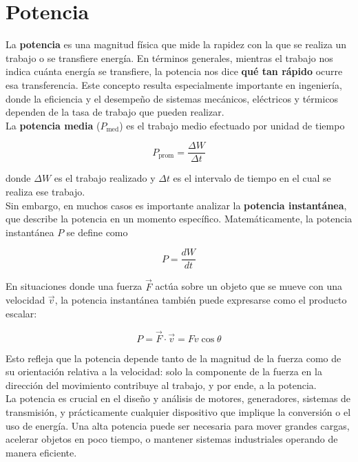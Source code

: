 \section{Potencia}
La \textbf{potencia} es una magnitud física que mide la rapidez con la que se realiza un trabajo o se transfiere energía. En términos generales, mientras el trabajo nos indica cuánta energía se transfiere, la potencia nos dice \textbf{qué tan rápido} ocurre esa transferencia. Este concepto resulta especialmente importante en ingeniería, donde la eficiencia y el desempeño de sistemas mecánicos, eléctricos y térmicos dependen de la tasa de trabajo que pueden realizar. \\[.35cm]

La \textbf{potencia media} (\( P_{\text{med}} \)) es  el trabajo medio efectuado por unidad de tiempo

\begin{equation}
P_{\text{prom}} = \frac{\Delta W}{\Delta t}
\end{equation}

donde \( \Delta W \) es el trabajo realizado y \( \Delta t \) es el intervalo de tiempo en el cual se realiza ese trabajo. \\[.35cm]

Sin embargo, en muchos casos es importante analizar la \textbf{potencia instantánea}, que describe la potencia en un momento específico. Matemáticamente, la potencia instantánea \( P \) se define como

\begin{equation}
P = \frac{dW}{dt}
\end{equation}

En situaciones donde una fuerza \( \vec{F} \) actúa sobre un objeto que se mueve con una velocidad \( \vec{v} \), la potencia instantánea también puede expresarse como el producto escalar:

\begin{equation}
P = \vec{F} \cdot \vec{v}=Fv\cos\theta
\end{equation}

Esto refleja que la potencia depende tanto de la magnitud de la fuerza como de su orientación relativa a la velocidad: solo la componente de la fuerza en la dirección del movimiento contribuye al trabajo, y por ende, a la potencia. \\[.35cm]

La potencia es crucial en el diseño y análisis de motores, generadores, sistemas de transmisión, y prácticamente cualquier dispositivo que implique la conversión o el uso de energía. Una alta potencia puede ser necesaria para mover grandes cargas, acelerar objetos en poco tiempo, o mantener sistemas industriales operando de manera eficiente.\\[.35cm]

